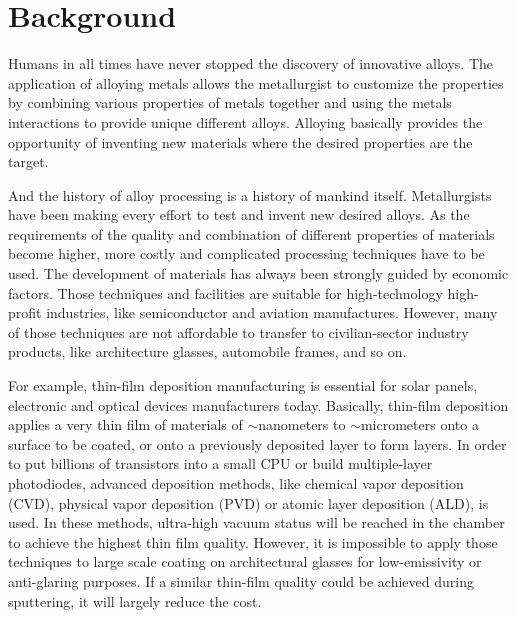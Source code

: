 \section{Background}

Humans in all times have never stopped the discovery of innovative alloys. The application of alloying metals allows the metallurgist to customize the properties by combining various properties of metals together and using the metals interactions to provide unique different alloys. Alloying basically provides the opportunity of inventing new materials where the desired properties are the target.

And the history of alloy processing is a history of mankind itself. Metallurgists have been making every effort to test and invent new desired alloys. As the requirements of the quality and combination of different properties of materials become higher, more costly and complicated processing techniques have to be used. The development of materials has always been strongly guided by economic factors. Those techniques and facilities are suitable for high-technology high-profit industries, like semiconductor and aviation manufactures. However, many of those techniques are not affordable to transfer to civilian-sector industry products, like architecture glasses, automobile frames, and so on.

For example, thin-film deposition manufacturing is essential for solar panels, electronic and optical devices manufacturers today. Basically, thin-film deposition applies a very thin film of materials of $\sim$nanometers to $\sim$micrometers onto a surface to be coated, or onto a previously deposited layer to form layers. In order to put billions of transistors into a small CPU or build multiple-layer photodiodes, advanced deposition methods, like chemical vapor deposition (CVD), physical vapor deposition (PVD) or atomic layer deposition (ALD), is used. In these methods, ultra-high vacuum status will be reached in the chamber to achieve the highest thin film quality. However, it is impossible to apply those techniques to large scale coating on architectural glasses for low-emissivity or anti-glaring purposes. If a similar thin-film quality could be achieved during sputtering, it will largely reduce the cost.


